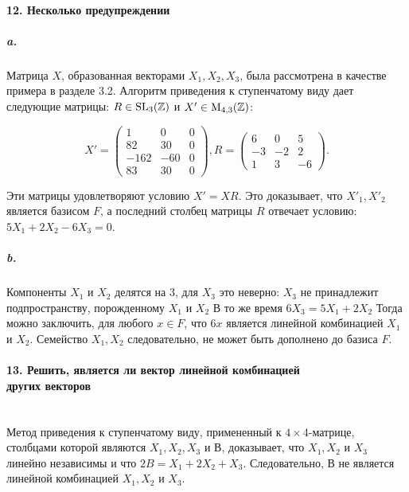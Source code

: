 {\paragraph{12. Несколько предупреждении}

\subparagraph{a.} Матрица $X$, образованная векторами $X_1, X_2, X_3$, была рассмотрена в качестве примера в разделе 3.2. Алгоритм приведения к ступенчатому виду дает следующие матрицы: $R \in \rm{SL_{3}}(\mathbb {Z})$ и $X' \in \rm{M_{4,3}}(\mathbb {Z})$:

\begin{equation*}
X' = {\begin{pmatrix} 1 & 0 & 0 \\ 82 & 30 & 0 \\ -162 & -60 & 0\\ 83 & 30 & 0 \end{pmatrix}}, 
R = {\begin{pmatrix} 6 & 0 & 5 \\ -3 & -2 & 2 \\ 1 & 3 & -6 \end{pmatrix}}.
\end{equation*}

\noindent Эти матрицы удовлетворяют условию $X' = XR$. Это доказывает, что
${X'_{1},X'_{2}}$ является базисом $F$, а последний столбец матрицы $R$ отвечает
условию: $5X_1 + 2X_2 - 6X_3 = 0$.

\subparagraph{b.} Компоненты $X_1$ и $X_2$ делятся на 3, для $X_3$ это неверно: $X_3$ не
принадлежит подпространству, порожденному $X_1$ и $X_2$ В то же время
$6X_3 = 5X_1 + 2X_2$ Тогда можно заключить, для любого $x \in F$, что $6x$
является линейной комбинацией $X_1$ и $X_2$. Семейство ${X_{1},X_{2}}$ следовательно, не может быть дополнено до базиса $F$.



\paragraph{13. Решить, является ли вектор линейной комбинацией\\
других векторов} \mbox{}\\

Метод приведения к ступенчатому виду, примененный к $4 \times 4$-матрице, столбцами которой являются $X_{1}, X_{2}, X_{3}$ и $В$, доказывает, что $X_{1}, X_{2}$ и $X_{3}$ линейно независимы и что $2B = X_1 + 2X_2 + X_3$. Следовательно, $В$ не является линейной комбинацией $X_{1}, X_{2}$ и $X_{3}$.

}
